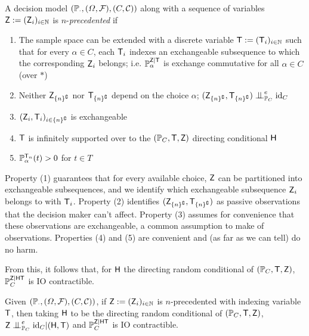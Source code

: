 \begin{definition}[Precedent]\label{def:preemption}
A decision model $(\mathbb{P}_\cdot,(\Omega,\mathcal{F}),(C,\mathcal{C}))$ along with a sequence of variables $\mathsf{Z}:=(\mathsf{Z}_i)_{i\in\mathbb{N}}$ is $n$-\emph{precedented} if
\begin{enumerate}
    \item The sample space can be extended with a discrete variable $\mathsf{T}:=(\mathsf{T}_i)_{i\in\mathbb{N}}$ such that for every $\alpha\in C$, each $\mathsf{T}_i$ indexes an exchangeable subsequence to which the corresponding $\mathsf{Z}_i$ belongs; i.e. $\mathbb{P}_\alpha^{\mathsf{Z}|\mathsf{T}}$ is exchange commutative for all $\alpha\in C$ (over $*$)
    \item Neither $\mathsf{Z}_{\{n\}^\complement}$ nor $\mathsf{T}_{\{n\}^\complement}$ depend on the choice $\alpha$; $(\RV{Z}_{\{n\}^\complement},\RV{T}_{\{n\}^\complement} )\CI^e_{\prob{P}_C} \text{id}_C$
    \item $(\mathsf{Z}_i,\mathsf{T}_i)_{i\in\{n\}^\complement}$ is exchangeable
    \item $\mathsf{T}$ is infinitely supported over to the $(\mathbb{P}_C,\mathsf{T},\mathsf{Z})$ directing conditional $\mathsf{H}$
    \item $\mathbb{P}_\alpha^{\mathsf{T}_n}(t)>0$ for $t\in T$
\end{enumerate}
\end{definition}
Property (1) guarantees that for every available choice, $\mathsf{Z}$ can be partitioned into exchangeable subsequences, and we identify which exchangeable subsequence $\mathsf{Z}_i$ belongs to with $\mathsf{T}_i$. Property (2) identifies $(\mathsf{Z}_{\{n\}^\complement},\mathsf{T}_{\{n\}^\complement})$ as passive observations that the decision maker can't affect. Property (3) assumes for convenience that these observations are exchangeable, a common assumption to make of observations. Properties (4) and (5) are convenient and (as far as we can tell) do no harm.

From this, it follows that, for $\mathsf{H}$ the directing random conditional of $(\mathbb{P}_C,\mathsf{T},\mathsf{Z})$, $\mathbb{P}_C^{\mathsf{Z}|\mathsf{HT}}$ is IO contractible.

\begin{theorem}
Given $(\mathbb{P}_\cdot,(\Omega,\mathcal{F}),(C,\mathcal{C}))$, if $\mathsf{Z}:=(\mathsf{Z}_i)_{i\in\mathbb{N}}$ is $n$-precedented with indexing variable $\mathsf{T}$, then taking $\mathsf{H}$ to be the directing random conditional of $(\mathbb{P}_C,\mathsf{T},\mathsf{Z})$, $\RV{Z}\CI^e_{\prob{P}_C} \text{id}_C | (\RV{H},\RV{T})$ and $\mathbb{P}_C^{\mathsf{Z}|\mathsf{HT}}$ is IO contractible.
\end{theorem}

